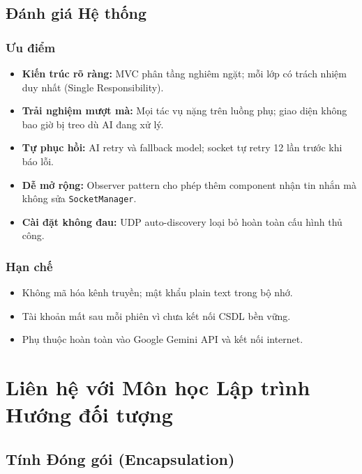 \documentclass[12pt, a4paper, oneside]{report}
\newcommand{\code}[1]{\texttt{\color{hustblue!80!black}#1}}
\begin{document}
\section{Đánh giá Hệ thống}

\subsection{Ưu điểm}

\begin{itemize}[leftmargin=2em, itemsep=5pt]
  \item \textbf{Kiến trúc rõ ràng:} MVC phân tầng nghiêm ngặt; mỗi lớp
    có trách nhiệm duy nhất (Single Responsibility).
  \item \textbf{Trải nghiệm mượt mà:} Mọi tác vụ nặng trên luồng phụ;
    giao diện không bao giờ bị treo dù AI đang xử lý.
  \item \textbf{Tự phục hồi:} AI retry và fallback model; socket tự retry
    12 lần trước khi báo lỗi.
  \item \textbf{Dễ mở rộng:} Observer pattern cho phép thêm component nhận
    tin nhắn mà không sửa \code{SocketManager}.
  \item \textbf{Cài đặt không đau:} UDP auto-discovery loại bỏ hoàn toàn
    cấu hình thủ công.
\end{itemize}

\subsection{Hạn chế}

\begin{itemize}[leftmargin=2em, itemsep=5pt]
  \item Không mã hóa kênh truyền; mật khẩu plain text trong bộ nhớ.
  \item Tài khoản mất sau mỗi phiên vì chưa kết nối CSDL bền vững.
  \item Phụ thuộc hoàn toàn vào Google Gemini API và kết nối internet.
\end{itemize}

\chapter{Liên hệ với Môn học Lập trình Hướng đối tượng}

\section{Tính Đóng gói (Encapsulation)}
\end{document}
